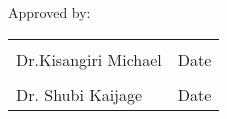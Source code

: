 \documentclass[a4paper,12pt]{article}
\begin{document}
 

 \cleardoublepage
 \begin{center}
 	\vspace*{.15\textheight}
 	
 	

 	
 	Approved by: 
 	\bigbreak
 	
 	\noindent\begin{tabular}{ll}
 		\makebox[2.5in]{\hrulefill} & \makebox[2.5in]{\hrulefill}\\
 		Dr.Kisangiri Michael & Date\\[8ex]%
 		\makebox[2.5in]{\hrulefill} & \makebox[2.5in]{\hrulefill}\\
 	Dr. Shubi Kaijage & Date\\
 	\end{tabular}
 	
 	
 
 \end{center}
 
\addtocounter{rom}{1}\setcounter{page}{2}~
\newpage\thispagestyle{plain}\setcounter{page}{3}
 
\tableofcontents
\listoffigures
\listoftables
\clearpage
{}







\newpage



% 

\newpage
 \newpage\cleardoublepage


\end{document}
